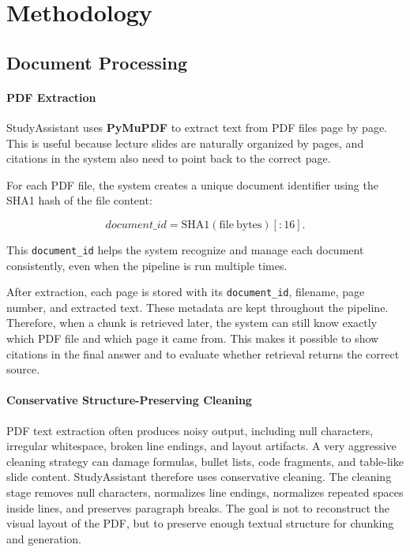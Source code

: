 \documentclass[11pt,a4paper]{article}
\begin{document}
\section{Methodology}

\subsection{Document Processing}

\paragraph{PDF Extraction}

StudyAssistant uses \textbf{PyMuPDF} to extract text from PDF files page by page. This is useful because lecture slides are naturally organized by pages, and citations in the system also need to point back to the correct page.

For each PDF file, the system creates a unique document identifier using the SHA1 hash of the file content:

\[
document\_id = \mathrm{SHA1}(\mathrm{file\ bytes})[:16].
\]

This \texttt{document\_id} helps the system recognize and manage each document consistently, even when the pipeline is run multiple times.

After extraction, each page is stored with its \texttt{document\_id}, filename, page number, and extracted text. These metadata are kept throughout the pipeline. Therefore, when a chunk is retrieved later, the system can still know exactly which PDF file and which page it came from. This makes it possible to show citations in the final answer and to evaluate whether retrieval returns the correct source.


\paragraph{Conservative Structure-Preserving Cleaning}

PDF text extraction often produces noisy output, including null characters,
irregular whitespace, broken line endings, and layout artifacts. A very
aggressive cleaning strategy can damage formulas, bullet lists, code fragments,
and table-like slide content. StudyAssistant therefore uses conservative
cleaning. The cleaning stage removes null characters, normalizes line endings,
normalizes repeated spaces inside lines, and preserves paragraph breaks. The
goal is not to reconstruct the visual layout of the PDF, but to preserve enough
textual structure for chunking and generation.
\end{document}
